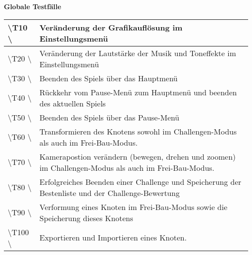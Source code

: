 \documentclass[10pt]{article}
\begin{document}
\newpage
\textbf{Globale Testfälle} \\
\begin{tabular}{|p{}|p{}|}
\hline 
\textbackslash T10  \textbackslash & Veränderung der Grafikauflösung  im Einstellungsmenü \\ 
\hline 
\textbackslash T20  \textbackslash & Veränderung der Lautstärke der Musik und Toneffekte im Einstellungsmenü  \\ 
\hline 
\textbackslash T30  \textbackslash & Beenden des Spiels über das Hauptmenü\\ 
\hline
\textbackslash T40  \textbackslash & Rückkehr vom Pause-Menü zum Hauptmenü und beenden des aktuellen Spiels \\ 
\hline
\textbackslash T50  \textbackslash & Beenden des Spiels über das Pause-Menü\\ 
\hline
\textbackslash T60  \textbackslash & Transformieren des Knotens sowohl im Challengen-Modus als auch im Frei-Bau-Modus.\\ 
\hline
\textbackslash T70  \textbackslash & Kamerapostion verändern (bewegen, drehen und zoomen) im Challengen-Modus als auch im Frei-Bau-Modus.\\ 
\hline
\textbackslash T80  \textbackslash & Erfolgreiches Beenden einer Challenge und Speicherung der Bestenliste und der Challenge-Bewertung\\ 
\hline
\textbackslash T90  \textbackslash & Verformung eines Knoten im Frei-Bau-Modus sowie die Speicherung dieses Knotens\\ 
\hline
\textbackslash T100  \textbackslash & Exportieren und Importieren eines Knoten.\\ 
\hline
\end{tabular} 
\end{document}
